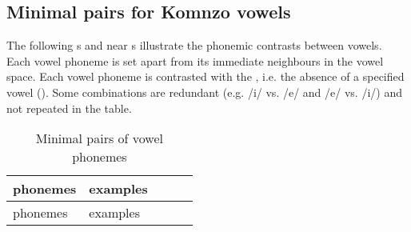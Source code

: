\subsection{Minimal pairs for Komnzo vowels} \label{minimalpairsvowels}

The following s and near s illustrate the phonemic contrasts between vowels. Each vowel phoneme is set apart from its immediate neighbours in the vowel space. Each vowel phoneme is contrasted with the , i.e. the absence of a specified vowel (\Zero{}). Some combinations are redundant (e.g. /i/ vs. /e/ and /e/ vs. /i/) and not repeated in the table.

\begin{longtable} {lllll}
\caption{Minimal pairs of vowel phonemes}
\label{minpairvow}\\
	\lsptoprule
	phonemes&examples&&&\\ \midrule
	\endfirsthead
	phonemes&examples&\\ \midrule
	\endhead


\end{longtable}
